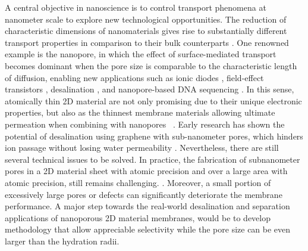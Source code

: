 %
A central objective in nano\-science is to control transport phenomena
at nanometer scale to explore new technological opportunities.  The
reduction of characteristic dimensions of nano\-materials gives rise
to substantially different transport properties in comparison to their
bulk counterparts \cite{Schoch_2008_nanofluid}.
%
One renowned example is the nanopore, in which the effect of
surface-mediated transport becomes dominant when the pore size is
comparable to the characteristic length of diffusion, enabling new
applications such as ionic diodes
\cite{Karnik_2007_nanofluidic,Siwy_2002_fabrication_NPore,Vlassiouk_2007_nanofluidic},
field-effect transistors \cite{Nam_2009_IFET_sub10nm}, desalination
\cite{Heiranian_2015_desali}, and nanopore-based DNA sequencing
\cite{Heerema_2016_gr_np_DNA,Garaj_2013_hugging_gr_pore}.
%
In this sense, atomically thin 2D material are not only promising due
to their unique electronic properties, but also as the thinnest
membrane materials allowing ultimate permeation when combining with
nanopores
~\cite{Suk_2010_water_PG,Jiang_2009_PG_gas,Celebi_2014_science,Koenig_2012,Drahushuk_2012_gas_permeation_gr}.
%
Early research has shown the potential of desalination using graphene
with sub-nanometer pores, which hinders ion passage without losing
water permeability
\cite{Cohen_Tanugi_2012,Suk_2014_ion_sub_5nm,Cohen_Tanugi_2014_permeab,Cohen_Tanugi_2015_PG,O_Hern_2014_ion,O_Hern_2015_ion_gr,Surwade_2015_desali_npg,Walker_2017_cation_select_2D,Ghosh_2018_PG_ion}.
Nevertheless, there are still several technical issues to be solved.
In practice, the fabrication of sub\-nanometer pores in
a 2D material sheet with atomic precision and over a large area with
atomic precision, still remains challenging.
\cite{Suk_2014_ion_sub_5nm,Rollings_2016_gating,O_Hern_2012_defect,Wang_2017_mechanism_thin_membrane}.
%
Moreover, a small portion of excessively large pores or defects can
significantly deteriorate the membrane performance.
%
A major step towards the real-world desalination and separation
applications of nanoporous 2D material membranes, would be to develop
methodology that allow appreciable selectivity while the pore size can
be even larger than the hydration radii.

